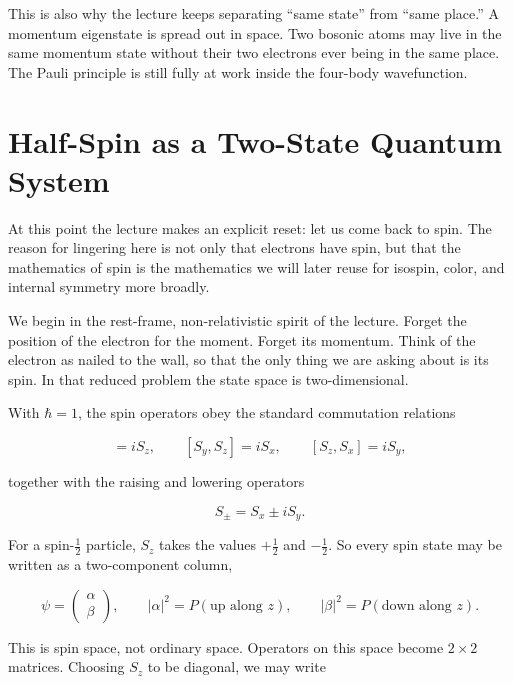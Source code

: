 This is also why the lecture keeps separating ``same state'' from ``same place.'' A momentum eigenstate is spread out in space. Two bosonic atoms may live in the same momentum state without their two electrons ever being in the same place. The Pauli principle is still fully at work inside the four-body wavefunction.

\section{Half-Spin as a Two-State Quantum System}

At this point the lecture makes an explicit reset: let us come back to spin. The reason for lingering here is not only that electrons have spin, but that the mathematics of spin is the mathematics we will later reuse for isospin, color, and internal symmetry more broadly.

We begin in the rest-frame, non-relativistic spirit of the lecture. Forget the position of the electron for the moment. Forget its momentum. Think of the electron as nailed to the wall, so that the only thing we are asking about is its spin. In that reduced problem the state space is two-dimensional.

With \(\hbar=1\), the spin operators obey the standard commutation relations

\begin{equation}
[S_x,S_y]=iS_z,\qquad [S_y,S_z]=iS_x,\qquad [S_z,S_x]=iS_y,
\end{equation}

together with the raising and lowering operators

\begin{equation}
S_\pm = S_x \pm iS_y.
\end{equation}

For a spin-\(\tfrac12\) particle, \(S_z\) takes the values \(+\tfrac12\) and \(-\tfrac12\). So every spin state may be written as a two-component column,

\begin{equation}
\psi=
\begin{pmatrix}
\alpha\\
\beta
\end{pmatrix},
\qquad
|\alpha|^2=P(\text{up along }z),
\qquad
|\beta|^2=P(\text{down along }z).
\end{equation}

This is spin space, not ordinary space. Operators on this space become \(2\times2\) matrices. Choosing \(S_z\) to be diagonal, we may write

